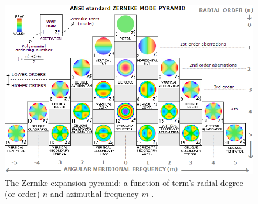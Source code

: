\begin{figure}[!t]
	\centering
	\includegraphics[width=0.98\linewidth]{__Images/02/zernike_pyramide.png}
	\caption[Zernike terms expansion pyramid]{The Zernike expansion pyramid: a function of term's radial degree (or order) $n$ and azimuthal frequency $m$ \cite{Sacek2015}.}
	\label{fig:zernike}
\end{figure}




